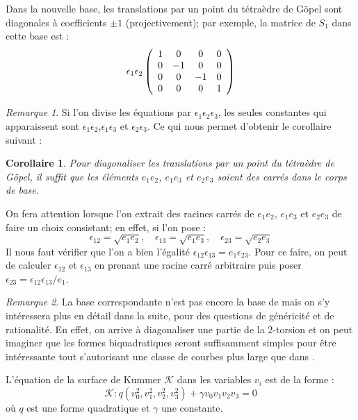 \documentclass[a4paper]{article}
\newtheorem{corollaire}[theoreme]{Corollaire}
\theoremstyle{definition}
\theoremstyle{remark}
\newtheorem{remarque}{Remarque}
\numberwithin{equation}{section}
\begin{document}
Dans la nouvelle base, les translations par un point du tétraèdre de G\"opel sont diagonales à coefficients $\pm 1$ (projectivement); par exemple, la matrice de $S_1$ dans cette base est :
\[ \epsilon_1\epsilon_2
\left(
  \begin{array}{ c c c c}
     1 & 0 & 0  & 0  \\
     0 & -1   & 0  & 0  \\
     0 & 0   & -1  & 0 \\
     0 & 0   & 0  & 1  \\
  \end{array} \right)
\]

\begin{remarque}
Si l'on divise les équations par $\epsilon_1\epsilon_2\epsilon_3$, les seules constantes qui apparaissent sont $\epsilon_1\epsilon_2$,$\epsilon_1\epsilon_3$ et $\epsilon_2\epsilon_3$. Ce qui nous permet d'obtenir le corollaire suivant :
\end{remarque}

\begin{corollaire}
Pour diagonaliser les translations par un point du tétraèdre de G\"opel, il suffit que les éléments $e_1e_2$, $e_1e_3$ et $e_2e_3$ soient des carrés dans le corps de base.
\end{corollaire}

On fera attention lorsque l'on extrait des racines carrés de $e_1e_2$, $e_1e_3$ et $e_2e_3$ de faire un choix consistant; en effet, si l'on pose :
$$\epsilon_{12} = \sqrt{e_1e_2}, \quad \epsilon_{13} = \sqrt{e_1e_3}, \quad \epsilon_{23} = \sqrt{e_2e_3}$$
Il nous faut vérifier que l'on a bien l'égalité $\epsilon_{12}\epsilon_{13} = e_1\epsilon_{23}$.
Pour ce faire, on peut de calculer $\epsilon_{12}$ et $\epsilon_{13}$ en prenant une racine carré arbitraire puis poser $\epsilon_{23} = \epsilon_{12}\epsilon_{13}/e_1$.

\begin{remarque}
La base correspondante n'est pas encore la base de \citet{gaudry} mais on s'y intéressera plus en détail dans la suite, pour des questions de généricité et de rationalité. En effet, on arrive à diagonaliser une partie de la 2-torsion et on peut imaginer que les formes biquadratiques seront suffisamment simples pour être intéressante tout s'autorisant une classe de courbes plus large que dans \citep{gaudry}.
\end{remarque}

L'équation de la surface de Kummer $\mathcal{K}$ dans les variables $v_i$ est de la forme \citep{cassels-Flynn} :
\begin{equation}
\label{eqKumDiag}
\mathcal{K} : q(v_0^2,v_1^2,v_2^2,v_3^2)+\gamma v_0v_1v_2v_3 = 0
\end{equation}
où $q$ est une forme quadratique et $\gamma$ une constante.
\end{document}
